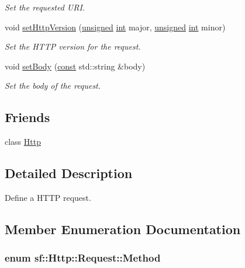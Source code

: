 \begin{DoxyCompactItemize}
\begin{DoxyCompactList}\small\item\em Set the requested U\-R\-I. \end{DoxyCompactList}\item 
void \hyperlink{classsf_1_1_http_1_1_request_aa683b607b737a6224a91387b4108d3c7}{set\-Http\-Version} (\hyperlink{curses_8priv_8h_aca40206900cfc164654362fa8d4ad1e6}{unsigned} \hyperlink{term__entry_8h_ad65b480f8c8270356b45a9890f6499ae}{int} major, \hyperlink{curses_8priv_8h_aca40206900cfc164654362fa8d4ad1e6}{unsigned} \hyperlink{term__entry_8h_ad65b480f8c8270356b45a9890f6499ae}{int} minor)
\begin{DoxyCompactList}\small\item\em Set the H\-T\-T\-P version for the request. \end{DoxyCompactList}\item 
void \hyperlink{classsf_1_1_http_1_1_request_ae9f61ec3fa1639c70e9b5780cb35578e}{set\-Body} (\hyperlink{term__entry_8h_a57bd63ce7f9a353488880e3de6692d5a}{const} std\-::string \&body)
\begin{DoxyCompactList}\small\item\em Set the body of the request. \end{DoxyCompactList}\end{DoxyCompactItemize}
\subsection*{Friends}
\begin{DoxyCompactItemize}
\item 
class \hyperlink{classsf_1_1_http_1_1_request_ad44371f4a337a0f6537733cdf6df8e76}{Http}
\end{DoxyCompactItemize}


\subsection{Detailed Description}
Define a H\-T\-T\-P request. 

\subsection{Member Enumeration Documentation}
\hypertarget{classsf_1_1_http_1_1_request_a620f8bff6f43e1378f321bf53fbf5598}{
\subsubsection[{Method}]{\setlength{\rightskip}{0pt plus 5cm}enum {\bf sf\-::\-Http\-::\-Request\-::\-Method}}}\label{classsf_1_1_http_1_1_request_a620f8bff6f43e1378f321bf53fbf5598}


